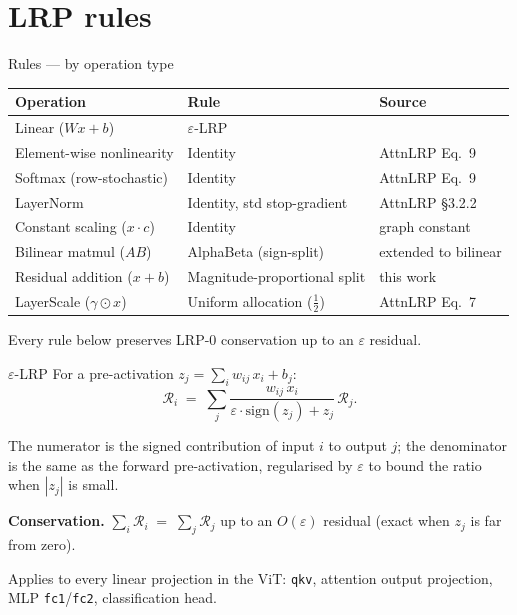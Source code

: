 \documentclass[
  aspectratio=169,
]{beamer}
\newcommand{\eps}{\varepsilon}
\newcommand{\Rel}{\mathcal{R}}
\newcommand{\half}{\frac{1}{2}}
\begin{document}
\section[Rules]{LRP rules}

\begin{frame}{Rules — by operation type}
\small
\begin{tabular}{lll}
\toprule
Operation & Rule & Source \\
\midrule
Linear ($Wx + b$)                & $\eps$-LRP                  & \cite{bach2015lrp} \\
Element-wise nonlinearity        & Identity                    & AttnLRP Eq.~9~\cite{achtibat2024attnlrp} \\
Softmax (row-stochastic)         & Identity                    & AttnLRP Eq.~9~\cite{achtibat2024attnlrp} \\
LayerNorm                        & Identity, std stop-gradient & AttnLRP \S 3.2.2~\cite{achtibat2024attnlrp} \\
Constant scaling ($x \cdot c$)   & Identity                    & graph constant \\
Bilinear matmul ($A B$)          & AlphaBeta (sign-split)      & \cite{bach2015lrp} extended to bilinear \\
Residual addition ($x + b$)      & Magnitude-proportional split & this work \\
LayerScale ($\gamma \odot x$)    & Uniform allocation ($\half$) & AttnLRP Eq.~7~\cite{achtibat2024attnlrp} \\
\bottomrule
\end{tabular}

\vspace{4mm}
\centering Every rule below preserves LRP-0 conservation up to an $\eps$ residual.
\end{frame}

\begin{frame}{$\eps$-LRP}
For a pre-activation $z_j = \sum_i w_{ij}\, x_i + b_j$:
\[
  \Rel_i \;=\; \sum_j \frac{w_{ij}\, x_i}{\eps\cdot\mathrm{sign}(z_j) + z_j}\, \Rel_j .
\]

The numerator is the signed contribution of input $i$ to output $j$;
the denominator is the same as the forward pre-activation, regularised
by $\eps$ to bound the ratio when $|z_j|$ is small.

\smallskip
\textbf{Conservation.}
$\sum_i \Rel_i \;=\; \sum_j \Rel_j$ up to an $O(\eps)$ residual
(exact when $z_j$ is far from zero).

\smallskip
Applies to every linear projection in the ViT: \texttt{qkv}, attention
output projection, MLP \texttt{fc1}/\texttt{fc2}, classification head.
\end{frame}
\end{document}
